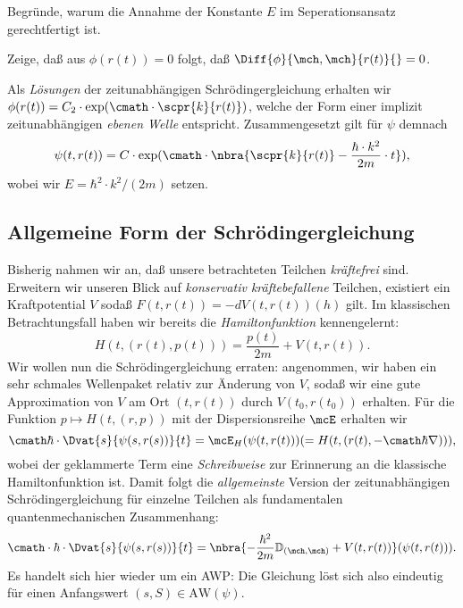 \documentclass{subfiles}
\begin{document}
        \begin{Aufgabe}
            \nr{} Begründe, warum die Annahme der Konstante $E$ im Seperationsansatz gerechtfertigt ist.

            \nr{} Zeige, daß aus $\phi(r(t)) = 0$ folgt, daß $\Diff{\phi}{\mch,\mch}{r(t)}{} = 0$.
        \end{Aufgabe}
        Als \emph{Lösungen} der zeitunabhängigen Schrödingergleichung erhalten wir $\phi(r(t)) = C_2\cdot\exp(\cmath\cdot\scpr{k}{r(t)})$, welche der Form einer implizit zeitunabhängigen \emph{ebenen Welle} entspricht. Zusammengesetzt gilt für $\psi$ demnach
        \[\psi(t,r(t)) = C\cdot\exp(\cmath\cdot\nbra{\scpr{k}{r(t)} - \frac{\hbar\cdot k^2}{2m}\cdot t}),\]
        wobei wir $E = \hbar^2\cdot k^2/(2m)$ setzen. 

    \subsection{Allgemeine Form der Schrödingergleichung}
        Bisherig nahmen wir an, daß unsere betrachteten Teilchen \emph{kräftefrei} sind. Erweitern wir unseren Blick auf \emph{konservativ kräftebefallene} Teilchen, existiert ein Kraftpotential $V$ sodaß $F(t,r(t)) = -dV(t,r(t))(h)$ gilt. Im klassischen Betrachtungsfall haben wir bereits die \emph{Hamiltonfunktion} kennengelernt:
        \[H(t,(r(t),p(t))) = \frac{p(t)}{2m} + V(t,r(t)).\]
        Wir wollen nun die Schrödingergleichung erraten: angenommen, wir haben ein sehr schmales Wellenpaket relativ zur Änderung von $V$, sodaß wir eine gute Approximation von $V$ am Ort $(t,r(t))$ durch $V(t_0,r(t_0))$ erhalten. Für die Funktion $p\mapsto H(t,(r,p))$ mit der Dispersionsreihe $\mcE$ erhalten wir
        \[\cmath\hbar\cdot\Dvat{s}{\psi(s,r(s))}{t} = \mcE_H(\psi(t,r(t))) (= H(t,(r(t),-\cmath\hbar\nabla))),\]
        wobei der geklammerte Term eine \textit{Schreibweise} zur Erinnerung an die klassische Hamiltonfunktion ist. Damit folgt die \emph{allgemeinste} Version der zeitunabhängigen Schrödingergleichung für einzelne Teilchen als fundamentalen quantenmechanischen Zusammenhang:
        \[\cmath\cdot\hbar\cdot\Dvat{s}{\psi(s,r(s))}{t} = \nbra{-\frac{\hbar^2}{2m}\mathbb{D}_{(\mch,\mch)} + V(t,r(t))}(\psi(t,r(t))).\]
        Es handelt sich hier wieder um ein AWP: Die Gleichung löst sich also eindeutig für einen Anfangswert $(s,S)\in\text{AW}(\psi)$. 
\end{document}

